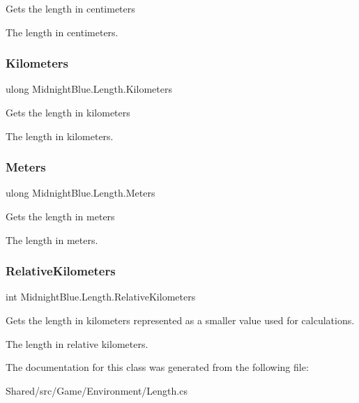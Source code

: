 Gets the length in centimeters 

The length in centimeters.\hypertarget{class_midnight_blue_1_1_length_abf0d08eda94640cdb4706f96c3a97a29}{}\label{class_midnight_blue_1_1_length_abf0d08eda94640cdb4706f96c3a97a29} 
\subsubsection{\texorpdfstring{Kilometers}{Kilometers}}
{\footnotesize\ttfamily ulong Midnight\+Blue.\+Length.\+Kilometers\hspace{0.3cm}{\ttfamily [get]}}



Gets the length in kilometers 

The length in kilometers.\hypertarget{class_midnight_blue_1_1_length_ac824fa58d75ab754c33cdc8bfd49e5b0}{}\label{class_midnight_blue_1_1_length_ac824fa58d75ab754c33cdc8bfd49e5b0} 
\subsubsection{\texorpdfstring{Meters}{Meters}}
{\footnotesize\ttfamily ulong Midnight\+Blue.\+Length.\+Meters\hspace{0.3cm}{\ttfamily [get]}}



Gets the length in meters 

The length in meters.\hypertarget{class_midnight_blue_1_1_length_a7073632b5e2dfc836266de44378941be}{}\label{class_midnight_blue_1_1_length_a7073632b5e2dfc836266de44378941be} 
\subsubsection{\texorpdfstring{Relative\+Kilometers}{RelativeKilometers}}
{\footnotesize\ttfamily int Midnight\+Blue.\+Length.\+Relative\+Kilometers\hspace{0.3cm}{\ttfamily [get]}}



Gets the length in kilometers represented as a smaller value used for calculations. 

The length in relative kilometers.

The documentation for this class was generated from the following file\+:\begin{DoxyCompactItemize}
\item 
Shared/src/\+Game/\+Environment/Length.\+cs\end{DoxyCompactItemize}
